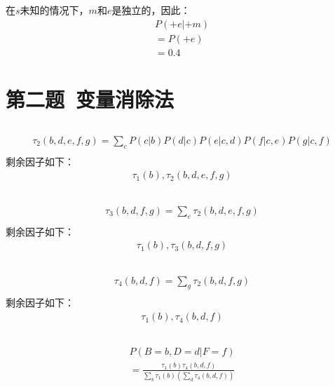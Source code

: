 \documentclass[12pt,a4paper]{article}
\begin{document}
\subsection{}
在$s$未知的情况下，$m$和$e$是独立的，因此：
\begin{gather*}
    P(+e|+m)\\
    =P(+e)\\
    =0.4
\end{gather*}
\section{第二题\ 变量消除法}
\subsection{}
\begin{gather*}
    \tau _2(b,d,e,f,g) = \sum _{c}P(c|b)P(d|c)P(e|c,d)P(f|c,e)P(g|c,f)\\
\end{gather*}
剩余因子如下：
\begin{gather*}
    \tau _1(b),\tau_2(b,d,e,f,g)
\end{gather*}
\subsection{}
\begin{gather*}
    \tau_3(b,d,f,g)=\sum_{e}\tau_2(b,d,e,f,g)\\
\end{gather*}
剩余因子如下：
\begin{gather*}
    \tau _1(b),\tau_3(b,d,f,g)
\end{gather*}
\subsection{}
\begin{gather*}
    \tau_4(b,d,f)=\sum_{g}\tau_2(b,d,f,g)\\
\end{gather*}
剩余因子如下：
\begin{gather*}
    \tau _1(b),\tau_4(b,d,f)
\end{gather*}
\subsection{}
\begin{gather*}
    P(B=b,D=d|F=f)\\
    =\frac{\tau_1(b)\tau_4(b,d,f)}{\sum_{b}\tau_1(b)(\sum_{d}\tau_4(b,d,f))}\\
\end{gather*}
\end{document}
